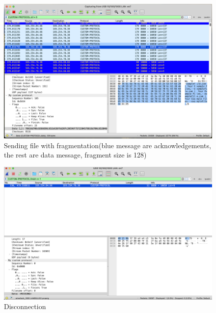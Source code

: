 \documentclass{article}
\begin{document}
\begin{figure}[!h]
    \centering
    \includegraphics[width=\textwidth]{images/fr.png}
    \caption{Sending file with fragmentation(blue message are acknowledgements, the rest are data message, fragment size is 128)}
    \label{fig:mesh1}
\end{figure}

\begin{figure}[!h]
    \centering
    \includegraphics[width=\textwidth]{images/fin.png}
    \caption{Disconnection}
    \label{fig:mesh1}
\end{figure}
\newpage
\end{document}
